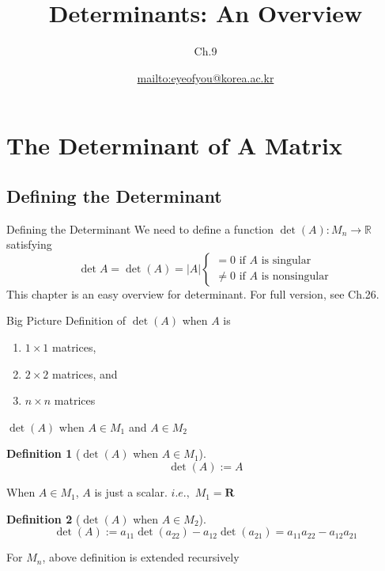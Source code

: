 \documentclass[a4paper,11pt]{article}
\author[조남운]{\url{mailto:eyeofyou@korea.ac.kr}}
\title{Determinants: An Overview}
\subtitle{Ch.9}
\newtheorem{defn}{Definition}
\begin{document}
\maketitle


\section{The Determinant of A Matrix} %
\label{sec:the_determinant_of_a_matrix}
\subsection{Defining the Determinant} %
\label{sub:defining_the_determinant}
\begin{frame}[t]{Defining the Determinant}
	We need to define a function $\det(A): M_n \rightarrow \mathbb{R}$ satisfying
	\[
		\det A = \det(A) = \vert A\vert \begin{cases}
			= 0 \text{ if $A$ is singular}\\
			\neq 0 \text{ if $A$ is nonsingular}
		\end{cases}
	\]
	This chapter is an easy overview for determinant. For full version, see Ch.26.
	\begin{block}
		{Big Picture}
		Definition of $\det(A)$ when $A$ is
		\begin{enumerate}
			\item $1\times 1$ matrices,
			\item $2\times 2$ matrices, and
			\item $n\times n$ matrices
		\end{enumerate}
	\end{block}
\end{frame}
\begin{frame}[t]{$\det(A)$ when $A\in M_1$ and $A\in M_2$}
	\begin{defn}
		[$\det(A)$ when $A\in M_1$]
		\[
			\det(A):=A
		\]
	\end{defn}
	When $A\in M_1$, $A$ is just a scalar. $i.e.,$ $M_1 = \mathbf{R}$
	\begin{defn}
		[$\det(A)$ when $A\in M_2$]
		\[
			\det(A):= a_{11} \det(a_{22}) - a_{12}\det(a_{21}) =a_{11}a_{22}-a_{12}a_{21}
		\]
	\end{defn}
	For $M_n$, above definition is extended recursively
\end{frame}
\end{document}
